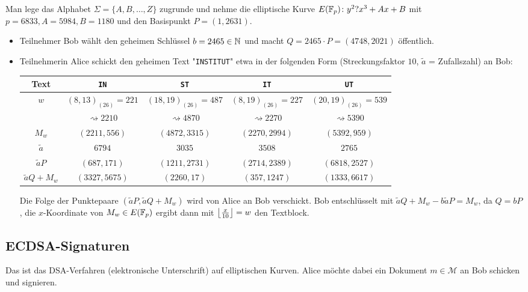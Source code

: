 \begin{bsp}
	Man lege das Alphabet $\Sigma = \{A,B,\dots,Z\}$ zugrunde und nehme die elliptische Kurve $E(\FF_p)\colon y^2 ? x^3 + Ax + B$ mit $p = 6833, A = 5984, B=1180$ und den Basispunkt $P = (1,2631)$.
	\begin{itemize}
		\item Teilnehmer Bob wählt den geheimen Schlüssel $b = 2465 \in \NN$ und macht $Q = 2465\cdot P = (4748,2021)$ öffentlich.
		\item Teilnehmerin Alice schickt den geheimen Text "\texttt{INSTITUT}" etwa in der folgenden Form (Streckungsfaktor $10$, $\tilde{a}$ = Zufallszahl) an Bob:
		\begin{center}
				\begin{tabular}{c|c|c|c|c}
				Text & \texttt{IN} & \texttt{ST} & \texttt{IT} & \texttt{UT} \\ 
				\hline $w$ & $(8,13)_{(26)} = 221$ & $(18,19)_{(26)} = 487 $ & $(8,19)_{(26)} = 227 $ & $(20,19)_{(26)} = 539 $ \\ 
				& $\rightsquigarrow 2210$ & $\rightsquigarrow 4870$ & $\rightsquigarrow 2270$ & $\rightsquigarrow 5390$ \\
				$M_w$ & $(2211,556)$ & $(4872,3315)$ & $(2270,2994)$ & $(5392,959)$ \\ 
				$\tilde{a}$ & $6794$ & $3035$ & $3508$ & $2765$ \\ 
				$\tilde{a}P$ & $(687,171)$ & $(1211,2731)$ & $(2714,2389)$ & $(6818,2527)$ \\ 
				$\tilde{a}Q + M_w$ & $(3327,5675)$ & $(2260,17)$ & $(357,1247)$ & $(1333,6617)$
				\end{tabular} 
		\end{center}
		Die Folge der Punktepaare $(\tilde{a}P,\tilde{a}Q + M_w)$ wird von Alice an Bob verschickt.
		Bob entschlüsselt mit $\tilde{a}Q + M_w - b \tilde{a}P = M_w$, da $Q = bP$, die $x$-Koordinate von $M_w \in E(\FF_p)$ ergibt dann mit $\floor*{\frac{x}{10}} = w$ den Textblock.
	\end{itemize}
\end{bsp}

\newpage
\subsection{ECDSA-Signaturen}
\label{sub:4.3}
\begin{bem}
	Das  ist das DSA-Verfahren (elektronische Unterschrift) auf elliptischen Kurven.
	Alice möchte dabei ein Dokument $m \in \mathcal{M}$ an Bob schicken und signieren.
\end{bem}


